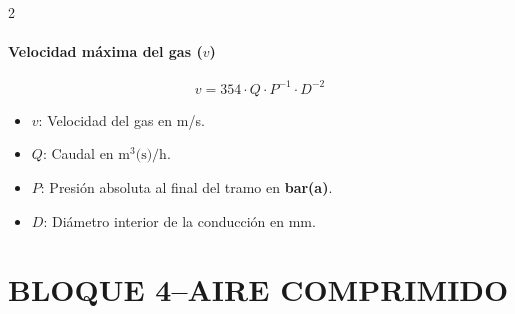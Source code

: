 \documentclass[11pt]{article}
\begin{document}
\begin{multicols*}{2}
    \paragraph*{Velocidad máxima del gas ($v$)}
    \begin{equation}
        v = 354 \cdot Q \cdot P^{-1} \cdot D^{-2}
    \end{equation}
    \begin{itemize}
        \item $v$: Velocidad del gas en m/s.
        \item $Q$: Caudal en $\text{m}^3\text{(s)/h}$.
        \item $P$: Presión absoluta al final del tramo en \textbf{bar(a)}.
        \item $D$: Diámetro interior de la conducción en mm.
    \end{itemize}

\end{multicols*}


\section*{BLOQUE 4--AIRE COMPRIMIDO}
\end{document}
